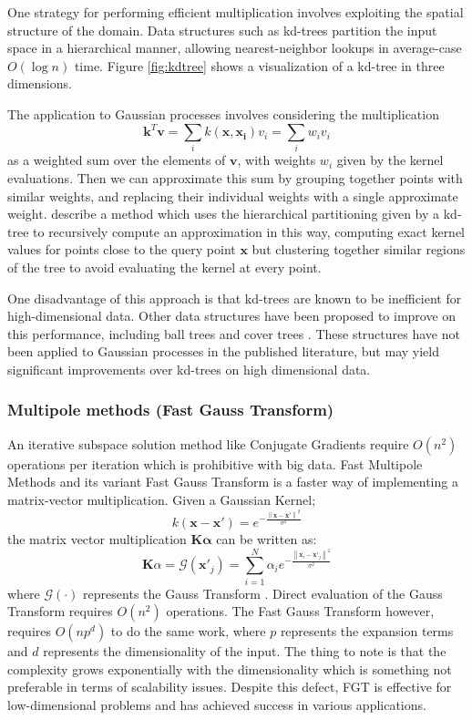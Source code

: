 \documentclass{article}
\begin{document}
One strategy for performing efficient multiplication involves exploiting the spatial structure of the domain. Data structures such as kd-trees partition the input space in a hierarchical manner, allowing nearest-neighbor lookups in average-case $O(\log n)$ time. Figure \ref{fig:kdtree} shows a visualization of a kd-tree in three dimensions.  

The application to Gaussian processes involves considering the multiplication 
\[\mathbf{k}^T \mathbf{v} = \sum_{i} k(\mathbf{x}, \mathbf{x_i})v_i = \sum_{i} w_iv_i\]
as a weighted sum over the elements of $\mathbf{v}$, with weights $w_i$ given by the kernel evaluations. Then we can approximate this sum by grouping together points with similar weights, and replacing their individual weights with a single approximate weight. \cite{shen2006fast} describe a method which uses the hierarchical partitioning given by a kd-tree to recursively compute an approximation in this way, computing exact kernel values for points close to the query point $\mathbf{x}$ but clustering together similar regions of the tree to avoid evaluating the kernel at every point. 

One disadvantage of this approach is that kd-trees are known to be inefficient for high-dimensional data. Other data structures have been proposed to improve on this performance, including ball trees \cite{omohundro1989five} and cover trees \cite{beygelzimer2006cover}. These structures have not been applied to Gaussian processes in the published literature, but may yield significant improvements over kd-trees on high dimensional data. 

\subsubsection{Multipole methods (Fast Gauss Transform)}
An iterative subspace solution method like Conjugate Gradients require $O(n^2)$ operations per iteration which is prohibitive with big data. Fast Multipole Methods and its variant Fast Gauss Transform is a faster way of implementing a matrix-vector multiplication. Given a Gaussian Kernel;
\begin{equation}
k(\mathbf{x}-\mathbf{x'})=e^{-\frac{\left \| \mathbf{x}-\mathbf{x'} \right \|^2}{\sigma^2}}
\end{equation}
the matrix vector multiplication $\mathbf{K}\mathbf{\alpha}$ can be written as:
\begin{equation}
\mathbf{K}\alpha=\mathcal{G}(\mathbf{x'}_j)=\sum_{i=1}^N\alpha_ie^{-\frac{\left \| \mathbf{x}_i-\mathbf{x'}_j \right \|^2}{\sigma^2}}
\end{equation}
where $\mathcal{G}(\cdot)$ represents the Gauss Transform \cite{FGTkernel}. Direct evaluation of the Gauss Transform requires $O(n^2)$ operations. The Fast Gauss Transform however, requires $O(np^d)$ to do the same work, where $p$ represents the expansion terms and $d$ represents the dimensionality of the input. The thing to note is that the complexity grows exponentially with the dimensionality which is something not preferable in terms of scalability issues.  Despite this defect, FGT is effective for low-dimensional problems and has achieved success in various applications. 
\end{document}

